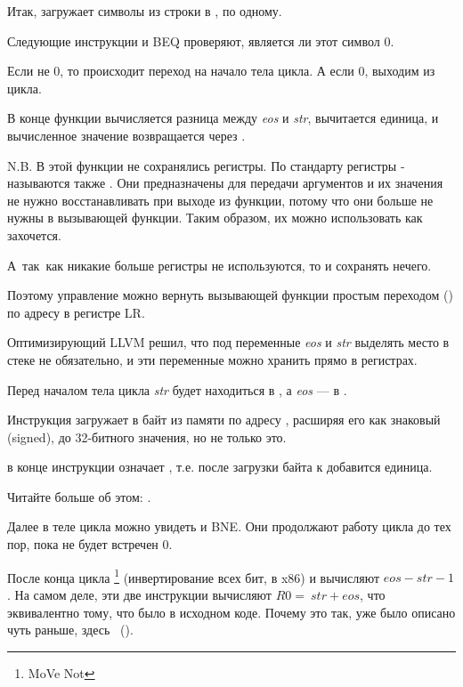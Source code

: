 Итак,  загружает символы из строки в , по одному.

Следующие инструкции \CMP и \ac{BEQ} проверяют, является ли этот символ 0.

Если не 0, то происходит переход на начало тела цикла.
А если 0, выходим из цикла.

В конце функции вычисляется разница между 
\emph{eos} и \emph{str}, вычитается единица, и вычисленное 
значение возвращается через .

N.B. В этой функции не сохранялись регистры.
По стандарту регистры - называются также .
Они предназначены для передачи аргументов и 
их значения не нужно восстанавливать при выходе из функции, потому что они больше не нужны в вызывающей функции.
Таким образом, их можно использовать как захочется.

А~так~как никакие больше регистры не используются, то и сохранять нечего.

Поэтому управление можно вернуть вызывающей функции 
простым переходом () по адресу в регистре \ac{LR}.

\mysubparagraph{\OptimizingXcodeIV (\ThumbMode)}



Оптимизирующий LLVM решил, что под переменные \emph{eos} и \emph{str} выделять место в стеке не обязательно,
и эти переменные можно хранить прямо в регистрах.

Перед началом тела цикла \emph{str} будет находиться в , 
а \emph{eos} --- в .

Инструкция  загружает в  байт из памяти по адресу , 
расширяя его как знаковый (signed), до 32-битного
значения, но не только это.

 в конце инструкции означает ,
т.е. после загрузки байта к  добавится единица.

Читайте больше об этом: .

Далее в теле цикла можно увидеть \CMP и \ac{BNE}. Они продолжают работу цикла до тех пор, 
пока не будет встречен 0.

После конца цикла \footnote{MoVe Not} (инвертирование всех бит, \NOT в x86) и \ADD вычисляют $eos - str - 1$.
На самом деле, эти две инструкции вычисляют $R0 = ~str + eos$, 
что эквивалентно тому, что было в исходном коде. Почему это так, уже было описано чуть раньше, здесь 
~().

